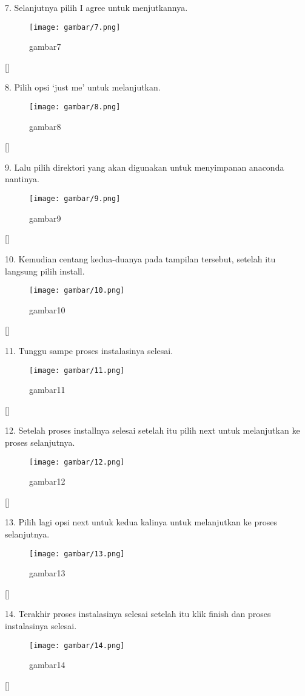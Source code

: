 \item 7.   Selanjutnya pilih I agree untuk menjutkannya.
\begin{figure}[h]
    \centering
    \texttt{[image: gambar/7.png]}
    \caption{gambar7} 
    \label{fig:my_label}
\end{figure}[]
\item 8.  Pilih opsi ‘just me’  untuk melanjutkan.
\begin{figure}[h]
    \centering
    \texttt{[image: gambar/8.png]}
    \caption{gambar8}
    \label{fig:my_label}
\end{figure}[]
\item 9.  Lalu pilih direktori yang akan digunakan untuk menyimpanan anaconda nantinya.
\begin{figure}[h]
    \centering
    \texttt{[image: gambar/9.png]}
    \caption{gambar9}
    \label{fig:my_label}
\end{figure}[]
\item 10.  Kemudian centang kedua-duanya  pada tampilan tersebut, setelah itu langsung pilih install.
\begin{figure}[h]
    \centering
    \texttt{[image: gambar/10.png]}
    \caption{gambar10}
    \label{fig:my_label}
\end{figure}[]
\item 11.  Tunggu sampe proses instalasinya selesai.
\begin{figure}[h]
    \centering
    \texttt{[image: gambar/11.png]}
    \caption{gambar11}
    \label{fig:my_label}
\end{figure}[]
\item 12.  Setelah proses installnya selesai setelah itu pilih next untuk melanjutkan ke proses selanjutnya.
\begin{figure}[h]
    \centering
    \texttt{[image: gambar/12.png]}
    \caption{gambar12}
    \label{fig:my_label}
\end{figure}[]
\item 13.  Pilih lagi opsi next untuk kedua kalinya untuk melanjutkan ke proses selanjutnya.
\begin{figure}[h]
    \centering
    \texttt{[image: gambar/13.png]}
    \caption{gambar13}
    \label{fig:my_label}
\end{figure}[]
\item 14.  Terakhir proses instalasinya selesai setelah itu klik finish dan proses instalasinya selesai.
\begin{figure}[h]
    \centering
    \texttt{[image: gambar/14.png]}
    \caption{gambar14}
    \label{fig:my_label}
\end{figure}[]



